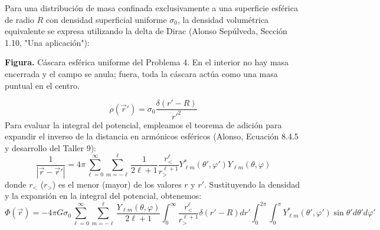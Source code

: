 \documentclass[a4paper]{article}
\begin{document}
Para una distribución de masa confinada exclusivamente a una superficie esférica de radio $R$ con densidad superficial uniforme $\sigma_0$, la densidad volumétrica equivalente se expresa utilizando la delta de Dirac (Alonso Sepúlveda, Sección 1.10, "Una aplicación"):

\begin{center}

\par\smallskip
{\small\textbf{Figura.} Cáscara esférica uniforme del Problema 4. En el interior no hay masa encerrada y el campo se anula; fuera, toda la cáscara actúa como una masa puntual en el centro.}
\end{center}
$$
\rho(\vec{r}') = \sigma_0 \frac{\delta(r' - R)}{r'^2}
$$
Para evaluar la integral del potencial, empleamos el teorema de adición para expandir el inverso de la distancia en armónicos esféricos (Alonso, Ecuación 8.4.5 y desarrollo del Taller 9):
$$
\frac{1}{|\vec{r} - \vec{r}'|} = 4\pi \sum_{\ell=0}^{\infty} \sum_{m=-\ell}^{\ell} \frac{1}{2\ell+1} \frac{r_{<}^\ell}{r_{>}^{\ell+1}} Y_{\ell m}^*(\theta', \varphi') Y_{\ell m}(\theta, \varphi)
$$
donde $r_{<}$ ($r_{>}$) es el menor (mayor) de los valores $r$ y $r'$. Sustituyendo la densidad y la expansión en la integral del potencial, obtenemos:
$$
\Phi(\vec{r}) = -4\pi G \sigma_0 \sum_{\ell=0}^{\infty} \sum_{m=-\ell}^{\ell} \frac{Y_{\ell m}(\theta, \varphi)}{2\ell+1} \int_0^\infty \frac{r_{<}^\ell}{r_{>}^{\ell+1}} \delta(r' - R) dr' \int_{0}^{2\pi} \int_{0}^{\pi} Y_{\ell m}^*(\theta', \varphi') \sin\theta' d\theta' d\varphi'
$$
\end{document}
